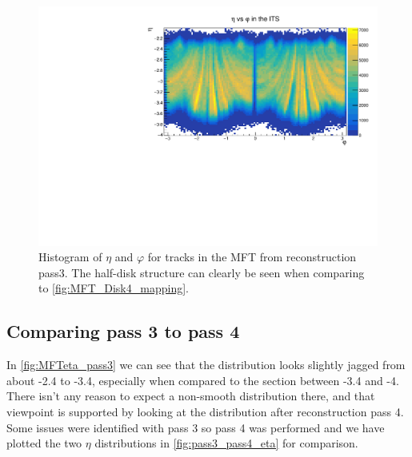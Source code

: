 \begin{figure}[h]
    \begin{center}
        \includegraphics[width=.8\textwidth]{Plots/pass3_MFT/eta_phi_pass3.pdf}
        \caption[$\eta$-$\varphi$ histogram for tracks from pass 3 in the MFT]{Histogram of $\eta$ and $\varphi$ for tracks in the MFT from reconstruction pass3. The half-disk structure can clearly be seen when comparing to \cref{fig:MFT_Disk4_mapping}. }
        \label{fig:eta_phi_pass3}
    \end{center}
\end{figure}

\subsection{Comparing pass 3 to pass 4}\label{sec:Comparing}
In \cref{fig:MFTeta_pass3} we can see that the distribution looks slightly jagged from about -2.4 to -3.4, especially when compared to the section between -3.4 and -4. There isn't any reason to expect a non-smooth distribution there, and that viewpoint is supported by looking at the distribution after reconstruction pass 4. Some issues were identified with pass 3 so pass 4 was performed and we have plotted the two $\eta$ distributions in \cref{fig:pass3_pass4_eta} for comparison.

